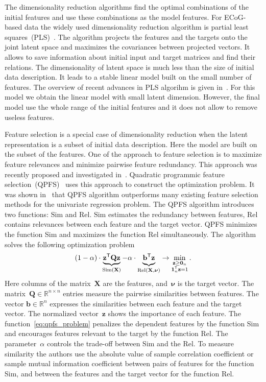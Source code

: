 \documentclass[12pt,oneside]{article}
\theoremstyle{definition}
\newcommand{\bz}{\mathbf{z}}
\newcommand{\bb}{\mathbf{b}}
\newcommand{\bX}{\mathbf{X}}
\newcommand{\bQ}{\mathbf{Q}}
\newcommand{\bbR}{\mathbb{R}}
\newcommand{\T}{\mathsf{T}}
\newcommand{\bnu}{\boldsymbol{\nu}}
\newcommand{\bOne}{\boldsymbol{1}}
\newcommand{\bZero}{\boldsymbol{0}}
\begin{document}
The dimensionality reduction algorithms find the optimal combinations of the initial features and use these combinations as the model features. 
For ECoG-based data the widely used dimensionality reduction algorithm is partial least squares~(PLS)~\cite{eliseyev2014stable,engel2017kernel,eliseyev2012l1}. 
The algorithm projects the features and the targets onto the joint latent space and maximizes the covariances between projected vectors. 
It allows to save information about initial input and target matrices and find their relations. 
The dimensionality of latent space is much less than the size of initial data description. It leads to a stable linear model built on the small number of features. 
The overview of recent advances in PLS algorihm is given in~\cite{rosipal2006overview,rosipal2011nonlinear}.
For this model we obtain the linear model with small latent dimension.
However, the final model use the whole range of the initial features and it does not allow to remove useless features. 

Feature selection is a special case of dimensionality reduction when the latent representation is a subset of initial data description. 
Here the model are built on the subset of the features. 
One of the approach to feature selection is to maximize feature relevances and minimize pairwise feature redundancy. 
This approach was recently proposed and investigated in~\cite{ding2005minimum,yamada2014high}.
Quadratic programmic feature selection~(QPFS)~\cite{rodriguez2010quadratic} uses this approach to construct the optimization problem. It was shown in~\cite{katrutsa2017comprehensive} that QPFS algorithm outperforms many existing feature selection methods for the univariate regression problem. 
The QPFS algorithm introduces two functions: $\text{Sim}$ and $\text{Rel}$.
$\text{Sim}$ estimates the redundancy between features, $\text{Rel}$ contains relevances between each feature and the target vector.
QPFS minimizes the function Sim and maximizes the function Rel simultaneously.
The algorithm solves the following optimization problem
\begin{equation}
(1 - \alpha) \cdot \underbrace{\bz^{\T} \bQ \bz}_{\text{Sim}(\bX)} - \alpha \cdot \underbrace{\vphantom{()} \bb^{\T} \bz}_{\text{Rel} (\bX, \bnu)} \rightarrow \min_{\substack{\bz \geq \bZero_n \\ \bOne_n^{\T} \bz=1}}.
\label{eq:qpfs_problem}
\end{equation}
Here columns of the matrix~$\bX$ are the features, and~$\bnu$ is the target vector. 
The matrix~$\bQ \in \bbR^{n \times n}$ entries measure the pairwise similarities between features.
The vector $\bb \in \bbR^n$ expresses the similarities between each feature and the target vector.
The normalized vector~$\bz$ shows the importance of each feature.
The function~\eqref{eq:qpfs_problem} penalizes the dependent features by the function Sim and encourages features relevant to the target by the function Rel.
The parameter~$\alpha$ controls the trade-off between Sim and the Rel.
To measure similarity the authors use the absolute value of sample correlation coefficient or sample mutual information coefficient between pairs of features for the function Sim, and between the features and the target vector for the function Rel.
\end{document}
